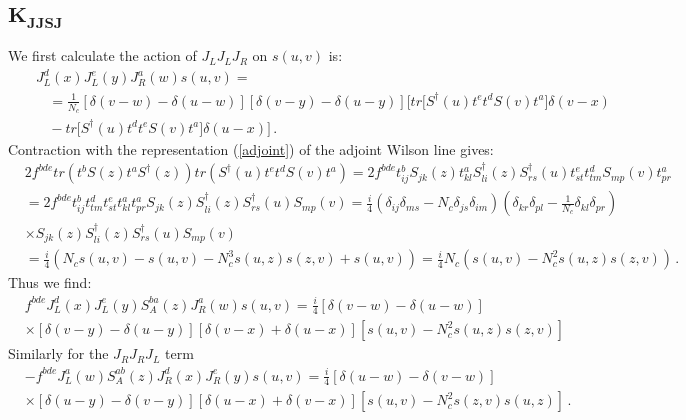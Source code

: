 \documentclass[11pt,a4paper]{article}
\begin{document}
\subsection*{$\mathbf{K_{JJSJ}}$}
We first calculate the action of $J_LJ_LJ_R$ on $s(u,v)$ is:
  \begin{eqnarray}\label{LLR}
&&J_{L}^{d}(x)J_{L}^{e}(y)J_{R}^{a}(w)s(u,v)=\nonumber \\
&&\ \ \ \ =\frac{1}{N_{c}}\left[\delta(v-w)-\delta(u-w)\right]\left[\delta(v-y)-\delta(u-y)\right]\Big[tr\Big[S^{\dagger}(u)t^{e}t^{d}S(v)t^{a}\Big]\delta(v-x)\nonumber \\ 
&&\ \ \ \ -tr\Big[S^{\dagger}(u)t^{d}t^{e}S(v)t^{a}\Big]\delta(u-x)\Big]\,.
\end{eqnarray}
Contraction with the representation (\ref{adjoint}) of the adjoint Wilson line gives:
 \begin{equation}\begin{split}
&2f^{bde}tr\left(t^{b}S(z)t^{a}S^{\dagger}(z)\right)tr\left(S^{\dagger}(u)t^{e}t^{d}S(v)t^{a}\right)=2f^{bde}t_{ij}^{b}S_{jk}(z)t_{kl}^{a}S_{li}^{\dagger}(z)S_{rs}^{\dagger}(u)t_{st}^{e}t_{tm}^{d}S_{mp}(v)t_{pr}^{a}\\
&=2f^{bde}t_{ij}^{b}t_{tm}^{d}t_{st}^{e}t_{kl}^{a}t_{pr}^{a}S_{jk}(z)S_{li}^{\dagger}(z)S_{rs}^{\dagger}(u)S_{mp}(v)=\frac{i}{4}\left(\delta_{ij}\delta_{ms}-N_{c}\delta_{js}\delta_{im}\right)\left(\delta_{kr}\delta_{pl}-\frac{1}{N_{c}}\delta_{kl}\delta_{pr}\right) \\ 
& \times S_{jk}(z)S_{li}^{\dagger}(z)S_{rs}^{\dagger}(u)S_{mp}(v)\\
&=\frac{i}{4}\left(N_{c}s(u,v)-s(u,v)-N_{c}^{3}s(u,z)s(z,v)+s(u,v)\right)=\frac{i}{4}N_{c}\left(s(u,v)-N_{c}^{2}s(u,z)s(z,v)\right)\,.
\end{split}\end{equation}
Thus we find:
  \begin{equation}\begin{split}
&f^{bde}J_{L}^{d}(x)J_{L}^{e}(y)S_A^{ba}(z)J_{R}^{a}(w)s(u,v)=\frac{i}{4}\left[\delta(v-w)-\delta(u-w)\right] \\
&\times \left[\delta(v-y)-\delta(u-y)\right]\left[\delta(v-x)+\delta(u-x)\right]\left[s(u,v)-N_{c}^{2}s(u,z)s(z,v)\right]
\end{split}\end{equation}
Similarly for the  $J_RJ_RJ_L$ term
  \begin{equation}\begin{split}
&-f^{bde}J_{L}^{a}(w)S_A^{ab}(z)J_{R}^{d}(x)J_{R}^{e}(y)s(u,v)=\frac{i}{4}\left[\delta(u-w)-\delta(v-w)\right]\\
&\times \left[\delta(u-y)-\delta(v-y)\right]\left[\delta(u-x)+\delta(v-x)\right]\left[s(u,v)-N_{c}^{2}s(z,v)s(u,z)\right]\,.\\
\end{split}\end{equation}
\end{document}
